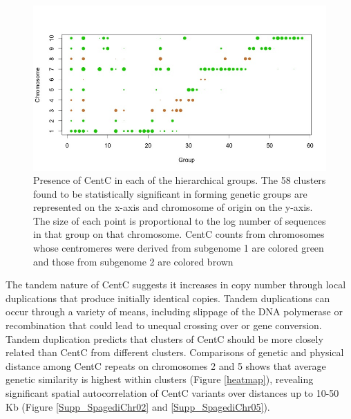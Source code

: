 \begin{figure}[h]
\centering
\includegraphics[width=1\textwidth]{Fig2_TWgroups}
\caption{Presence of CentC in each of the hierarchical groups.  The 58 clusters found to be statistically significant in forming genetic groups are represented on the x-axis and chromosome of origin on the y-axis. The size of each point is proportional to the log number of sequences in that group on that chromosome. CentC counts from chromosomes whose centromeres were derived from subgenome 1 are colored green and those from subgenome 2 are colored brown 
}
\label{pcoa}    
\end{figure}

The tandem nature of CentC suggests it increases in copy number through local duplications that produce initially identical copies.  
Tandem duplications can occur through a variety of means, including slippage of the DNA polymerase or recombination that could lead to unequal crossing over or gene conversion.
Tandem duplication predicts that  clusters of CentC should be more closely related than CentC from different clusters.  
Comparisons of genetic and physical distance among CentC repeats on chromosomes 2 and 5 shows that average genetic similarity is highest within clusters (Figure \ref{heatmap}), revealing significant spatial autocorrelation of CentC variants over distances up to 10-50 Kb (Figure \ref{Supp_SpagediChr02} and \ref{Supp_SpagediChr05}).

